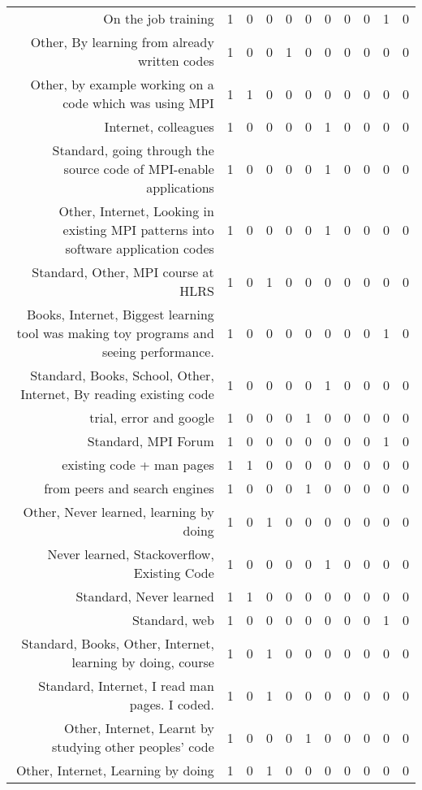 {\begin{landscape}
\begin{longtable}[htb]{r|c|c|c|c|c|c|c|c|c|c}
{On the job training} & 1 & 0 & 0 & 0 & 0 & 0 & 0 & 0 & 1 & 0 \\%
{Other, By learning from already written codes} & 1 & 0 & 0 & 1 & 0 & 0 & 0 & 0 & 0 & 0 \\%
{Other, by example working on a code which was using MPI} & 1 & 1 & 0 & 0 & 0 & 0 & 0 & 0 & 0 & 0 \\%
{Internet, colleagues} & 1 & 0 & 0 & 0 & 0 & 1 & 0 & 0 & 0 & 0 \\%
{Standard, going through the source code of MPI-enable applications} & 1 & 0 & 0 & 0 & 0 & 1 & 0 & 0 & 0 & 0 \\%
{Other, Internet, Looking in existing MPI patterns into software application codes} & 1 & 0 & 0 & 0 & 0 & 1 & 0 & 0 & 0 & 0 \\%
{Standard, Other, MPI course at HLRS} & 1 & 0 & 1 & 0 & 0 & 0 & 0 & 0 & 0 & 0 \\%
{Books, Internet, Biggest learning tool was making toy programs and seeing performance.} & 1 & 0 & 0 & 0 & 0 & 0 & 0 & 0 & 1 & 0 \\%
{Standard, Books, School, Other, Internet, By reading existing code} & 1 & 0 & 0 & 0 & 0 & 1 & 0 & 0 & 0 & 0 \\%
{trial, error and google} & 1 & 0 & 0 & 0 & 1 & 0 & 0 & 0 & 0 & 0 \\%
{Standard, MPI Forum} & 1 & 0 & 0 & 0 & 0 & 0 & 0 & 0 & 1 & 0 \\%
{existing code + man pages} & 1 & 1 & 0 & 0 & 0 & 0 & 0 & 0 & 0 & 0 \\%
{from peers and search engines} & 1 & 0 & 0 & 0 & 1 & 0 & 0 & 0 & 0 & 0 \\%
{Other, Never learned, learning by doing} & 1 & 0 & 1 & 0 & 0 & 0 & 0 & 0 & 0 & 0 \\%
{Never learned, Stackoverflow, Existing Code} & 1 & 0 & 0 & 0 & 0 & 1 & 0 & 0 & 0 & 0 \\%
{Standard, Never learned} & 1 & 1 & 0 & 0 & 0 & 0 & 0 & 0 & 0 & 0 \\%
{Standard, web} & 1 & 0 & 0 & 0 & 0 & 0 & 0 & 0 & 1 & 0 \\%
{Standard, Books, Other, Internet, learning by doing, course} & 1 & 0 & 1 & 0 & 0 & 0 & 0 & 0 & 0 & 0 \\%
{Standard, Internet, I read man pages. I coded.} & 1 & 0 & 1 & 0 & 0 & 0 & 0 & 0 & 0 & 0 \\%
{Other, Internet, Learnt by studying other peoples' code} & 1 & 0 & 0 & 0 & 1 & 0 & 0 & 0 & 0 & 0 \\%
{Other, Internet, Learning by doing} & 1 & 0 & 1 & 0 & 0 & 0 & 0 & 0 & 0 & 0 \\%

\end{longtable}
\end{landscape}}
